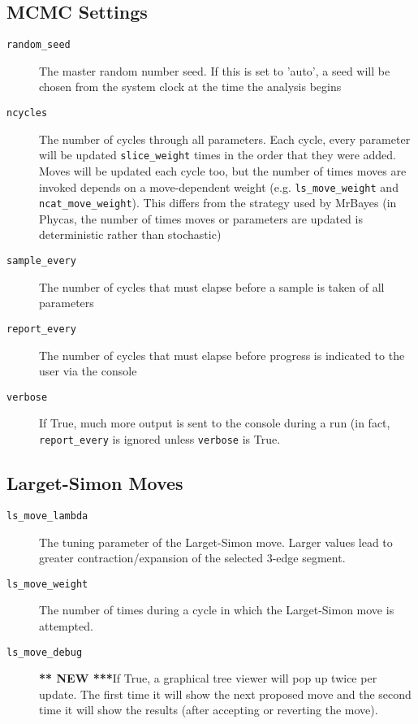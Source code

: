 \documentclass[10pt]{article}
\newcommand{\new}{{\bfseries *** NEW ***}}
\begin{document}
\subsection{MCMC Settings}
\begin{description}
\item[{\tt random\_seed}] The master random number seed. If this is set to 'auto', a seed will be chosen from the system clock at the time the analysis begins
\item[{\tt ncycles}] The number of cycles through all parameters. Each cycle, every parameter will be updated \verb+slice_weight+ times in the order that they were added. Moves will be updated each cycle too, but the number of times moves are invoked depends on a move-dependent weight (e.g. \verb+ls_move_weight+ and \verb+ncat_move_weight+). This differs from the strategy used by MrBayes (in Phycas, the number of times moves or parameters are updated is deterministic rather than stochastic)
\item[{\tt sample\_every}] The number of cycles that must elapse before a sample is taken of all parameters
\item[{\tt report\_every}] The number of cycles that must elapse before progress is indicated to the user via the console
\item[{\tt verbose}] If True, much more output is sent to the console during a run (in fact, \verb+report_every+ is ignored unless \verb+verbose+ is True.
\end{description}

\subsection{Larget-Simon Moves}
\begin{description}
\item[{\tt ls\_move\_lambda}] The tuning parameter of the Larget-Simon move. Larger values lead to greater contraction/expansion of the selected 3-edge segment.
\item[{\tt ls\_move\_weight}] The number of times during a cycle in which the Larget-Simon move is attempted.
\item[{\tt ls\_move\_debug}] \new If True, a graphical tree viewer will pop up twice per update. The first time it will show the next proposed move and the second time it will show the results (after accepting or reverting the move).
\end{description}
\end{document}
